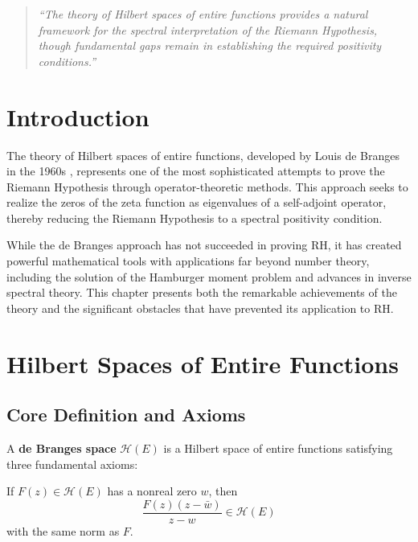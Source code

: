 
\begin{quote}
\textit{``The theory of Hilbert spaces of entire functions provides a natural framework for the spectral interpretation of the Riemann Hypothesis, though fundamental gaps remain in establishing the required positivity conditions.''}
\end{quote}

\section{Introduction}

The theory of Hilbert spaces of entire functions, developed by Louis de Branges in the 1960s \cite{debranges1968}, represents one of the most sophisticated attempts to prove the Riemann Hypothesis through operator-theoretic methods. This approach seeks to realize the zeros of the zeta function as eigenvalues of a self-adjoint operator, thereby reducing the Riemann Hypothesis to a spectral positivity condition.

While the de Branges approach has not succeeded in proving RH, it has created powerful mathematical tools with applications far beyond number theory, including the solution of the Hamburger moment problem and advances in inverse spectral theory. This chapter presents both the remarkable achievements of the theory and the significant obstacles that have prevented its application to RH.

\section{Hilbert Spaces of Entire Functions}
\label{sec:hilbert-spaces-entire}

\subsection{Core Definition and Axioms}

\begin{definition}
A \textbf{de Branges space} $\mathcal{H}(E)$ is a Hilbert space of entire functions satisfying three fundamental axioms:
\end{definition}

\begin{axiom}
If $F(z) \in \mathcal{H}(E)$ has a nonreal zero $w$, then 
$$\frac{F(z)(z-\bar{w})}{z-w} \in \mathcal{H}(E)$$
with the same norm as $F$.
\end{axiom}

